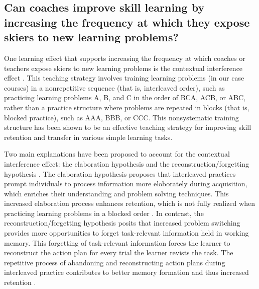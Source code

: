 \subsection{Can coaches improve skill learning by increasing the frequency at which they expose skiers to new learning problems?}
One learning effect that supports increasing the frequency at which coaches or teachers expose skiers to new learning problems is the contextual interference effect \cite{lee_contextual_2012, shea_contextual_1979, magill_review_1990}. This teaching strategy involves training learning problems (in our case courses) in a nonrepetitive sequence (that is, interleaved order), such as practicing learning problems A, B, and C in the order of BCA, ACB, or ABC, rather than a practice structure where problems are repeated in blocks (that is, blocked practice), such as AAA, BBB, or CCC. This nonsystematic training structure has been shown to be an effective teaching strategy for improving skill retention and transfer in various simple learning tasks\cite{tsutsui_contextual_1998, simon_metacognition_2001, shea_context_1983, shea_contextual_1979, tsay_signatures_2023}.

Two main explanations have been proposed to account for the contextual interference effect: the elaboration hypothesis \cite{shea_contextual_1979, shea_context_1983} and the reconstruction/forgetting hypothesis \cite{lee_can_1985, lee_locus_1983}. The elaboration hypothesis proposes that interleaved practices prompt individuals to process information more eloborately during acquisition, which enriches their understanding and problem solving techniques. This increased elaboration process enhances retention, which is not fully realized when practicing learning problems in a blocked order \cite{shea_contextual_1979, shea_context_1983}. In contrast, the reconstruction/forgetting hypothesis posits that increased problem switching provides more opportunities to forget task-relevant information held in working memory. This forgetting of task-relevant information forces the learner to reconstruct the action plan for every trial the learner revists the task. The repetitive process of abandoning and reconstructing action plans during interleaved practice contributes to better memory formation and thus increased retention \cite{lee_can_1985, lee_locus_1983}.

